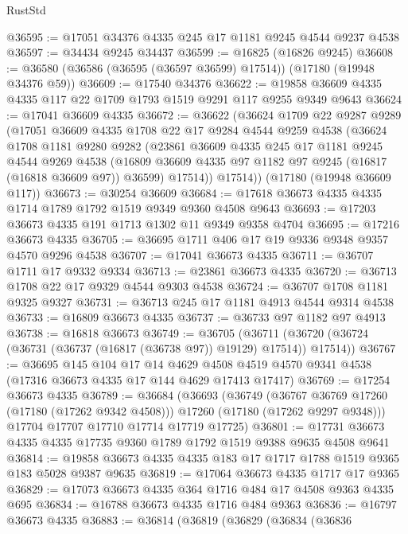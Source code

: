 \begin{lexlean}{RustStd}
\begin{coremodule}
{\begin{coremodule}
{{{{{{{{{{{{{{{{{{{{{{{{{{{{{{{{{{{{{{{{{{{{{{{{{{{{{{{@36595 := @17051 @34376 @4335 @245 @17 @1181 @9245 @4544 @9237 @4538
@36597 := @34434 @9245 @34437
@36599 := @16825 (@16826 @9245)
@36608 := @36580 (@36586 (@36595 (@36597 @36599) @17514)) (@17180 (@19948 @34376 @59))
@36609 := @17540 @34376
@36622 := @19858 @36609 @4335 @4335 @117 @22 @1709 @1793 @1519 @9291 @117 @9255 @9349 @9643
@36624 := @17041 @36609 @4335
@36672 := @36622
    (@36624
      @1709
      @22
      @9287
      @9289
      (@17051
        @36609
        @4335
        @1708
        @22
        @17
        @9284
        @4544
        @9259
        @4538
        (@36624
          @1708
          @1181
          @9280
          @9282
          (@23861
            @36609
            @4335
            @245
            @17
            @1181
            @9245
            @4544
            @9269
            @4538
            (@16809 @36609 @4335 @97 @1182 @97 @9245 (@16817 (@16818 @36609 @97)) @36599)
            @17514))
        @17514))
    (@17180 (@19948 @36609 @117))
@36673 := @30254 @36609
@36684 := @17618 @36673 @4335 @4335 @1714 @1789 @1792 @1519 @9349 @9360 @4508 @9643
@36693 := @17203 @36673 @4335 @191 @1713 @1302 @11 @9349 @9358 @4704
@36695 := @17216 @36673 @4335
@36705 := @36695 @1711 @406 @17 @19 @9336 @9348 @9357 @4570 @9296 @4538
@36707 := @17041 @36673 @4335
@36711 := @36707 @1711 @17 @9332 @9334
@36713 := @23861 @36673 @4335
@36720 := @36713 @1708 @22 @17 @9329 @4544 @9303 @4538
@36724 := @36707 @1708 @1181 @9325 @9327
@36731 := @36713 @245 @17 @1181 @4913 @4544 @9314 @4538
@36733 := @16809 @36673 @4335
@36737 := @36733 @97 @1182 @97 @4913
@36738 := @16818 @36673
@36749 := @36705
    (@36711 (@36720 (@36724 (@36731 (@36737 (@16817 (@36738 @97)) @19129) @17514)) @17514))
@36767 := @36695
    @145
    @104
    @17
    @14
    @4629
    @4508
    @4519
    @4570
    @9341
    @4538
    (@17316 @36673 @4335 @17 @144 @4629 @17413 @17417)
@36769 := @17254 @36673 @4335
@36789 := @36684
    (@36693
      (@36749
        (@36767 @36769 @17260 (@17180 (@17262 @9342 @4508)))
        @17260
        (@17180 (@17262 @9297 @9348)))
      @17704
      @17707
      @17710
      @17714
      @17719
      @17725)
@36801 := @17731 @36673 @4335 @4335 @17735 @9360 @1789 @1792 @1519 @9388 @9635 @4508 @9641
@36814 := @19858 @36673 @4335 @4335 @183 @17 @1717 @1788 @1519 @9365 @183 @5028 @9387 @9635
@36819 := @17064 @36673 @4335 @1717 @17 @9365
@36829 := @17073 @36673 @4335 @364 @1716 @484 @17 @4508 @9363 @4335 @695
@36834 := @16788 @36673 @4335 @1716 @484 @9363
@36836 := @16797 @36673 @4335
@36883 := @36814
    (@36819
      (@36829
        (@36834
          (@36836
}}}}}}}}}}}}}}}}}}}}}}}}}}}}}}}}}}}}}}}}}}}}}}}}}}}}}}}
\end{coremodule}}
\end{coremodule}
\end{lexlean}
